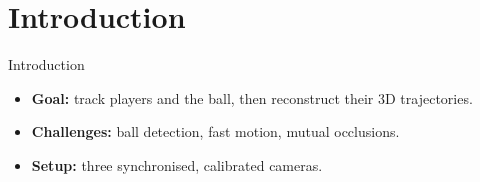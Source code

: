 \section{Introduction}
\label{sec:introduction}
\begin{frame}{Introduction}
\begin{itemize}
  \item \textbf{Goal:} track players and the ball, then reconstruct their 3D trajectories.
  \item \textbf{Challenges:} ball detection, fast motion, mutual occlusions.
  \item \textbf{Setup:} three synchronised, calibrated cameras.
\end{itemize}
\end{frame}